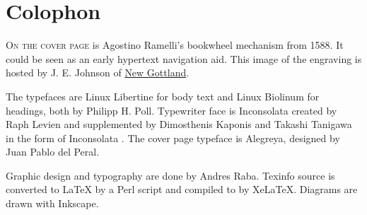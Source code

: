 \chapter*{Colophon}
\label{Colophon}

\lettrine[lraise=-0.03,loversize=0.08]{O}{n the cover page} is Agostino Ramelli’s bookwheel mechanism from 1588. It could be seen as an early hypertext navigation aid. This image of the engraving is hosted by J. E. Johnson of \href{http://newgottland.com/2012/02/09/before-the-ereader-there-was-the-wheelreader/ramelli_bookwheel_1032px/}{New Gottland}.

The typefaces are Linux Libertine for body text and Linux Biolinum for headings, both by Philipp H. Poll. Typewriter face is Inconsolata created by Raph Levien and supplemented by Dimosthenis Kaponis and Takashi Tanigawa in the form of Inconsolata . The cover page typeface is Alegreya, designed by Juan Pablo del Peral.

Graphic design and typography are done by Andres Raba. Texinfo source is converted to LaTeX by a Perl script and compiled to  by XeLaTeX. Diagrams are drawn with Inkscape.
